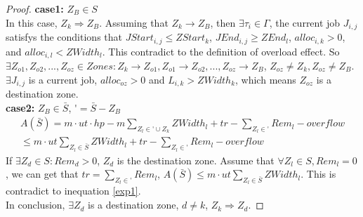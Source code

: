 \documentclass{article}
\begin{document}
\begin{proof}
	\textbf{case1:} $Z_B \in S$\\
	In this case, $Z_k \Rightarrow Z_B$. 
	Assuming that $Z_k \to Z_B$, then $\exists \tau_i \in \Gamma$, the current job $J_{i,j}$ satisfys the conditions that $JStart_{i,j} \leq ZStart_k$, $JEnd_{i,j} \geq ZEnd_l$, $alloc_{i,k} > 0$, and $alloc_{i,l}<ZWidth_l$. This contradict to the definition of overload effect. So $\exists Z_{o1}, Z_{o2}, ..., Z_{oz} \in Zones : Z_k \to Z_{o1}, Z_{o1} \to Z_{o2}, ..., Z_{oz} \to Z_B$, $Z_{oz} \neq Z_k, Z_{oz} \neq Z_B$.  \\
	$\exists J_{i,j}$ is a current job, $alloc_{oz} > 0$ and $L_{i,k} > ZWidth_k$, which means $Z_{oz}$ is a destination zone. \\
	\textbf{case2:} $Z_B \in \bar{S}$,
	$\mathop{{\bar{S}}'} = \bar{S} - Z_B$
	\[
		\begin{split}
		A(\bar{S}) = m \cdot ut \cdot hp - m \sum\limits_{Z_l \in \mathop{{\bar{S}}'} \cup {Z_k}} ZWidth_l + tr - \sum\limits_{Z_l \in \mathop{{\bar{S}}'}} Rem_l - overflow \\
		\leq m \cdot ut \sum\limits_{Z_l \in \bar{S}} ZWidth_l + tr - \sum\limits_{Z_l \in \mathop{{\bar{S}}'}} Rem_l - overflow
	\end{split}
	\]
	If $\exists Z_d \in S : Rem_d > 0$, $Z_d$ is the destination zone.
	Assume that $\forall Z_l \in S, Rem_l = 0$, we can get that $tr = \sum\limits_{Z_l \in \mathop{{\bar{S}}'}} Rem_l$, 
	$A(\bar{S}) \leq m \cdot ut \sum\limits_{Z_l \in \bar{S}} ZWidth_l$.
	This is contradict to inequation \ref{exp1}.\\
	In conclusion, $\exists Z_d$ is a destination zone, $d \ne k$, $Z_k \Rightarrow Z_d$.
\end{proof}
	
\end{document}
